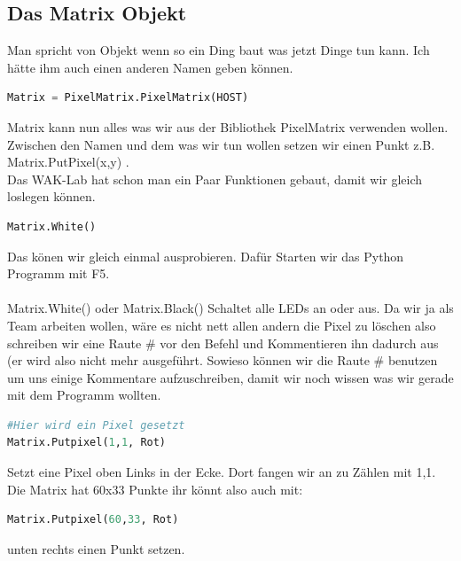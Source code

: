 \subsection{\large{Das Matrix Objekt}}
Man spricht von Objekt wenn so ein Ding baut was jetzt Dinge tun kann. Ich hätte ihm auch einen anderen Namen geben können. \\
\begin{lstlisting}[language=Python, caption=Das Matrix Objekt]
Matrix = PixelMatrix.PixelMatrix(HOST)
\end{lstlisting}
Matrix kann nun alles was wir aus der Bibliothek PixelMatrix verwenden wollen. Zwischen den Namen und dem was wir tun wollen setzen wir einen Punkt z.B. Matrix.PutPixel(x,y) .\\
Das WAK-Lab hat schon man ein Paar Funktionen gebaut, damit wir gleich loslegen können.\\
\begin{lstlisting}[language=Python, caption=Matrix Löschen]
Matrix.White()
\end{lstlisting}
Das könen wir gleich einmal ausprobieren. Dafür Starten wir das Python Programm mit F5.\\
\ \\
Matrix.White() oder Matrix.Black() Schaltet alle LEDs an oder aus. Da wir ja als Team arbeiten wollen, wäre es nicht nett allen andern die Pixel zu löschen also schreiben wir eine Raute \# vor den Befehl und Kommentieren ihn dadurch aus (er wird also nicht mehr ausgeführt. Sowieso können wir die Raute \# benutzen um uns einige Kommentare aufzuschreiben, damit wir noch wissen was wir gerade mit dem Programm wollten.\\
\begin{lstlisting}[language=Python, caption=Einen Pixel setzen]
#Hier wird ein Pixel gesetzt
Matrix.Putpixel(1,1, Rot)
\end{lstlisting}
Setzt eine Pixel oben Links in der Ecke. Dort fangen wir an zu Zählen mit 1,1. Die Matrix hat 60x33 Punkte ihr könnt also auch mit: \begin{lstlisting}[language=Python, caption=Noch einen Pixel setzen]
Matrix.Putpixel(60,33, Rot)
\end{lstlisting}
unten rechts einen Punkt setzen.\\
